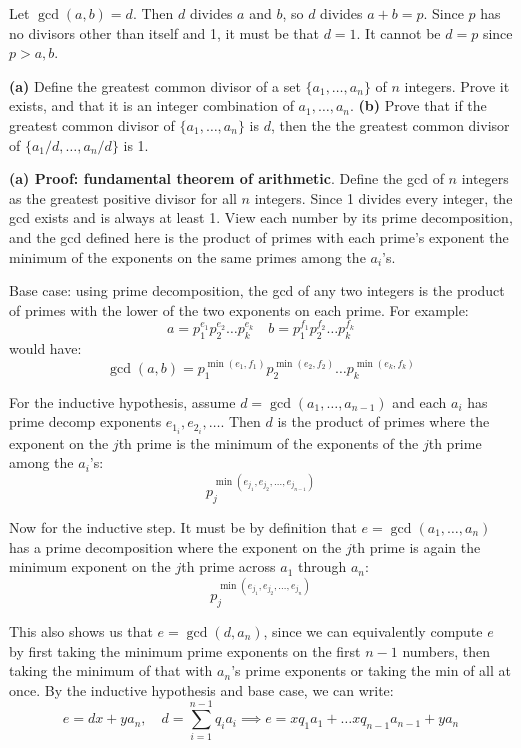\documentclass{article}
\begin{document}
Let $\gcd(a, b) = d$. Then $d$ divides $a$ and $b$, so $d$ divides $a + b = p$. Since $p$ has no divisors other than itself and 1, it must be that $d = 1$. It cannot be $d = p$ since $p > a, b$.

\begin{problem}
\textbf{(a)} Define the greatest common divisor of a set $\{a_1, \ldots, a_n\}$ of $n$ integers. Prove it exists, and that it is an integer combination of $a_1, \ldots, a_n$.
\textbf{(b)} Prove that if the greatest common divisor of $\{a_1, \ldots, a_n\}$ is $d$, then the the greatest common divisor of $\{a_1 / d, \ldots, a_n / d\}$ is 1.
\end{problem}

\textbf{(a) Proof: fundamental theorem of arithmetic}. Define the gcd of $n$ integers as the greatest positive divisor for all $n$ integers. Since 1 divides every integer, the gcd exists and is always at least 1. View each number by its prime decomposition, and the gcd defined here is the product of primes with each prime's exponent the minimum of the exponents on the same primes among the $a_i$'s.

Base case: using prime decomposition, the gcd of any two integers is the product of primes with the lower of the two exponents on each prime. For example:
$$a = p_1^{e_1} p_2^{e_2} \ldots p_k^{e_k} \quad b = p_1^{f_1} p_2^{f_2} \ldots p_k^{f_k}$$
would have:
$$\gcd(a, b) = p_1^{\min(e_1, f_1)} p_2^{\min(e_2, f_2)} \ldots p_k^{\min(e_k, f_k)}$$

For the inductive hypothesis, assume $d = \gcd(a_1, \ldots, a_{n-1})$ and each $a_i$ has prime decomp exponents $e_{1_i}, e_{2_i}, \ldots$. Then $d$ is the product of primes where the exponent on the $j$th prime is the minimum of the exponents of the $j$th prime among the $a_i$'s:
$$p_j^{\min(e_{j_1}, e_{j_2}, \ldots, e_{j_{n-1}})}$$

Now for the inductive step. It must be by definition that $e = \gcd(a_1, \ldots, a_n)$ has a prime decomposition where the exponent on the $j$th prime is again the minimum exponent on the $j$th prime across $a_1$ through $a_n$:
$$p_j^{\min(e_{j_1}, e_{j_2}, \ldots, e_{j_n})}$$

This also shows us that $e = \gcd(d, a_n)$, since we can equivalently compute $e$ by first taking the minimum prime exponents on the first $n-1$ numbers, then taking the minimum of that with $a_n$'s prime exponents or taking the min of all at once. By the inductive hypothesis and base case, we can write:
$$e = dx + ya_n, \quad d = \sum_{i=1}^{n-1} q_i a_i \implies e = xq_1 a_1 + \ldots xq_{n-1}a_{n-1} + ya_n$$
\end{document}
